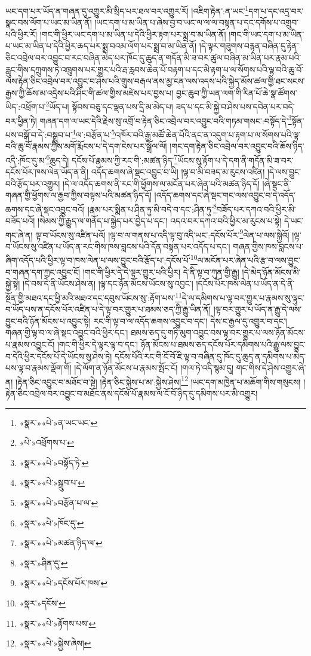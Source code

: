 ཡང་དག་པར་ཡོད་ན་གཞན་དུ་འགྱུར་མི་སྲིད་པར་ཐལ་བར་འགྱུར་རོ། །འཇིག་རྟེན་:ན་ཡང་\footnote{«སྣར་»«པེ་»ན་ཡང་ཡང་}དག་པ་དང་འདྲ་བར་སྣང་བས་ལོག་པ་ཡང་མ་ཡིན་ནོ། །ཡང་དག་པ་མ་ཡིན་པ་ཞེས་བྱ་བ་ཡང་ལ་ལ་ལ་བསྟན་པ་དང་དགོས་པ་འགྲུབ་པའི་ཕྱིར་རོ། །གང་གི་ཕྱིར་ཡང་དག་པ་མ་ཡིན་པ་དེའི་ཕྱིར་རྟག་པར་སྨྲ་བ་མ་ཡིན་ནོ། །གང་གི་ཡང་དག་པ་མ་ཡིན་པ་ཡང་མ་ཡིན་པ་དེའི་ཕྱིར་ཆད་པར་སྨྲ་བའམ་ལོག་པར་སྨྲ་བ་མ་ཡིན་ནོ། །དེ་ལྟར་གཟུགས་བརྙན་བཞིན་དུ་རྟེན་ཅིང་འབྲེལ་བར་འབྱུང་བ་རང་བཞིན་མེད་པར་ཁོང་དུ་ཆུད་ན་གདོན་མི་ཟ་བར་ཚུལ་བཞིན་མ་ཡིན་པར་རྣམ་པའི་རླུང་གིས་དཀྲུགས་ཏེ་འཁྲུགས་པར་གྱུར་པའི་རྦ་རླབས་ཆེན་པོ་བརྟག་པ་དང་མི་རྟག་པ་ལ་སོགས་པའི་ལྟ་བའི་ཆུ་བོ་ལས་རྟེན་ཅིང་འབྲེལ་བར་འབྱུང་བ་ཤེས་པའི་གྲུས་བརྒལ་ནས་མྱ་ངན་ལས་འདས་པའི་སྐྱེད་མོས་ཚལ་གྱི་ཐང་སངས་རྒྱས་ཀྱི་ཆོས་མ་འདྲེས་པའི་ཤིང་གི་ཚལ་གྱིས་མཛེས་པར་བྱས་པ། བྱང་ཆུབ་ཀྱི་ཡན་ལག་གི་རིན་པོ་ཆེ་སྣ་ཚོགས་ཡིད་:འཕྲོག་པ་\footnote{«པེ་»འཕྲོགས་པ་}ཡོད་པ། སྟོབས་བཅུ་དང་ལྡན་པས་དྲི་མ་མེད་པ། ཟད་པ་དང་མི་སྐྱེ་བ་ཤེས་པས་དབེན་པར་བདེ་བར་ཕྱིན་ཏེ། གཞན་དག་ལ་ཡང་དེའི་རྗེས་སུ་འགྲོ་བ་རྟེན་ཅིང་འབྲེལ་བར་འབྱུང་བའི་གཏམ་གསང་:བསྟོད་དེ་\footnote{«སྣར་»«པེ་»བསྟོད་ཏེ་}སྟོན་པས་བསྒོ་བ་དེ་:བསྒྲུབ་པ་\footnote{«སྣར་»«པེ་»སྒྲུབ་པ་}ལ་:བརྩོན་པ་\footnote{«སྣར་»«པེ་»བརྩོན་པ་ལ་}འཁོར་བའི་རྒྱ་མཚོ་ཆེན་པོའི་ནང་ན་འདུག་པ་རྟག་པ་ལ་སོགས་པའི་ལྟ་བའི་ཆུ་བོ་རྣམས་ཀྱིས་མགོ་རྨོངས་པ་དེ་དག་ངེས་པར་སྒྲོལ་ལོ། །གང་དག་རྟེན་ཅིང་འབྲེལ་བར་འབྱུང་བའི་ཆོས་ཉིད་འདི་:ཁོང་དུ་མ་\footnote{«སྣར་»«པེ་»ཁོང་དུ་}ཆུད་དེ། དངོས་པོ་རྣམས་ཀྱི་རང་གི་:མཚན་ཉིད་\footnote{«སྣར་»«པེ་»མཚན་ཉིད་ལ་}ཡོངས་སུ་རྟོག་པ་དེ་དག་ནི་གདོན་མི་ཟ་བར་དངོས་པོར་ཁས་ལེན་ཡོད་ན་ནི། འདོད་ཆགས་ཞེ་སྡང་འབྱུང་བ་ཡི། །ལྟ་བ་མི་བཟད་མ་རུངས་འཛིན། །དེ་ལས་བྱུང་བའི་རྩོད་པར་འགྱུར། །དེ་ལ་འདོད་ཆགས་ནི་རང་གི་ཕྱོགས་ལ་མངོན་པར་ཞེན་པའི་མཚན་ཉིད་དོ། །ཞེ་སྡང་ནི་གཞན་གྱི་ཕྱོགས་ལ་རྒྱབ་ཀྱིས་བལྟས་པའི་མཚན་ཉིད་དོ། །འདོད་ཆགས་དང་ཞེ་སྡང་གང་ལས་འབྱུང་བ་དེ་འདོད་ཆགས་དང་ཞེ་སྡང་འབྱུང་བའོ། །རྣམ་པར་སྨིན་པ་ཤིན་ཏུ་མི་བདེ་བ་དང་:ཤིན་ཏུ་\footnote{«སྣར་»ཤིན་དུ་}བཟོད་པར་དཀའ་བའི་ཕྱིར་མི་བཟོད་པའོ། །སེམས་ཀྱི་རྒྱུད་ལ་གནོད་པ་སྐྱེད་པར་བྱེད་པ་དང་། འདའ་བར་དཀའ་བའི་ཕྱིར་མ་རུངས་པ་སྟེ། དེ་ཡང་གང་ཞེ་ན། ལྟ་བ་ཡོངས་སུ་འཛིན་པའོ། །ལྟ་བ་ལ་གནས་པ་འདི་ལྟ་བུ་འདི་ཡང་:དངོས་པོར་\footnote{«སྣར་»«པེ་»དངོས་པོར་ཁས་}ལེན་པ་ལས་སྐྱེའོ། །ལྟ་བ་ཡོངས་སུ་འཛིན་པ་ཡོད་ན་རང་གིས་ཁས་བླངས་པའི་དོན་བསྟན་པར་འདོད་པ་དང་། གཞན་གྱིས་ཁས་བླངས་པ་ཞིག་འདོད་པའི་ཕྱིར་ལྟ་བ་ཁས་ལེན་པ་ལས་བྱུང་བའི་རྩོད་པ་:དངོས་པོ་\footnote{«སྣར་»དངོས་}ལ་མངོན་པར་ཞེན་པའི་རྩ་བ་ལས་བྱུང་བ་གཞན་དག་ཀྱང་འབྱུང་ངོ། །གང་གི་ཕྱིར་དེ་དེ་ལྟར་གྱུར་པའི་ཕྱིར། དེ་ནི་ལྟ་བ་ཀུན་གྱི་རྒྱུ། །དེ་མེད་ཉོན་མོངས་མི་སྐྱེ་སྟེ། །དེ་བས་དེ་ནི་ཡོངས་ཤེས་ན། །ལྟ་དང་ཉོན་མོངས་ཡོངས་སུ་འབྱང་། །དངོས་པོར་ཁས་ལེན་པ་ཡོད་ན་དེ་ནི་སྔོན་གྱི་མཐའ་དང་ཕྱི་མའི་མཐའ་དང་དབུས་ཡོངས་སུ་:རྟོག་པས་\footnote{«སྣར་»«པེ་»རྟོགས་པས་}དེ་ལ་དམིགས་པ་ལྟ་བར་གྱུར་པ་རྣམས་སུ་ལྟུང་བ་ཡོད་པས་ན་དངོས་པོར་འཛིན་པ་དེ་ལྟ་བར་གྱུར་པ་ཐམས་ཅད་ཀྱི་རྒྱུ་ཡིན་ནོ། །ལྟ་བར་གྱུར་པ་ཡོད་ན་རྒྱུ་དེ་ལས་བྱུང་བའི་ཉོན་མོངས་པ་འབྱུང་སྟེ། རང་གི་ལྟ་བ་ལ་འདོད་ཆགས་འབྱུང་བ་དང་། དེས་ང་རྒྱལ་དུ་འགྱུར་བ་དང་། གཞན་གྱི་ལྟ་བ་ལ་ཞེ་སྡང་འབྱུང་བའི་ཕྱིར་དང་། ཐམས་ཅད་དུ་གཏི་མུག་འབྱུང་བས་ལྟ་བར་གྱུར་པ་ལས་ཉོན་མོངས་པ་རྣམས་འབྱུང་ངོ། །གང་གི་ཕྱིར་དེ་ལྟར་ལྟ་བ་དང་། ཉོན་མོངས་པ་ཐམས་ཅད་དངོས་པོར་དམིགས་པའི་རྒྱུ་ལས་བྱུང་བ་དེའི་ཕྱིར་དངོས་པོ་དེ་ཡོངས་སུ་ཤེས་ཏེ། དངོས་པོའི་རང་གི་ངོ་བོ་ཇི་ལྟ་བ་བཞིན་དུ་ཁོང་དུ་ཆུད་ན་དམིགས་པ་མེད་པས་ལྟ་བ་རྣམས་ལྡོག་གོ། །དེ་ལོག་ན་ཉོན་མོངས་པ་རྣམས་སྤོང་ངོ། །གལ་ཏེ་འདི་སྙམ་དུ། གང་གིས་དེ་ཤེས་འགྱུར་ཞེ་ན། །རྟེན་ཅིང་འབྱུང་བ་མཐོང་བ་སྟེ། །རྟེན་ཅིང་སྐྱེས་པ་མ་:སྐྱེས་ཤེས།\footnote{«སྣར་»«པེ་»སྐྱེས་ཞེས།} །ཡང་དག་མཁྱེན་པ་མཆོག་གིས་གསུངས། །རྟེན་ཅིང་འབྲེལ་བར་འབྱུང་བ་མཐོང་ནས་དངོས་པོ་རྣམས་ལ་ངོ་བོ་ཉིད་དུ་དམིགས་པར་མི་འགྱུར། 